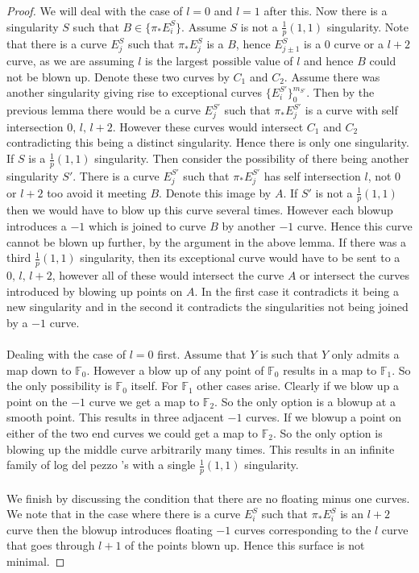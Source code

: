 \documentclass[11pt]{report}
\theoremstyle{definition}
\theoremstyle{definition}
\theoremstyle{definition}
\theoremstyle{definition}
\theoremstyle{definition}
\theoremstyle{definition}
\theoremstyle{definition}
\theoremstyle{definition}
\newcommand{\ldp}{log del pezzo }
\newcommand{\mb}[1]{\mathbb{#1}}
\begin{document}
\begin{proof}
We will deal with the case of $l = 0$ and $l = 1$ after this. Now there is a singularity $S$ such that $B \in \{ \pi_*E_i^S \}$. Assume $S$ is not a $\frac{1}{p}(1,1)$ singularity. Note that there is a curve $E_j^S$ such that $\pi_* E_j^S$ is a $B$, hence $E_{j\pm 1}^S$ is a $0$ curve or a $l+2$ curve, as we are assuming $l$ is the largest possible value of $l$ and hence $B$ could not be blown up. Denote these two curves by $C_1$ and $C_2$. Assume there was another singularity giving rise to exceptional curves $\{ E_i^{S'} \}_{0}^{m_{S'}} $. Then by the previous lemma there would be a curve $E_j^{S'}$ such that $\pi_* E_j^{S'}$ is a curve with self intersection $0, \,  l,\,  l+2$. However these curves would intersect $C_1$ and $C_2$ contradicting this being a distinct singularity. Hence there is only one singularity. If $S$ is a $\frac{1}{p}(1,1)$ singularity. Then consider the possibility of there being another singularity $S'$. There is a curve $E_j^{S'}$ such that $\pi_* E_j^{S'}$ has self intersection $l$, not $0$ or $l+2$ too avoid it meeting $B$. Denote this image by $A$. If $S'$ is not a $\frac{1}{p}(1,1)$ then we would have to blow up this curve several times. However each blowup introduces a $-1$ which is joined to curve $B$ by another $-1$ curve. Hence this curve cannot be blown up further, by the argument in the above lemma. If there was a third $\frac{1}{p}(1,1)$ singularity, then its exceptional curve would have to be sent to a $0, \, l, \, l+2$, however all of these would intersect the curve $A$ or intersect the curves introduced by blowing up points on $A$. In the first case it contradicts it being a new singularity and in the second it contradicts the singularities not being joined by a $-1$ curve.
\\
\\
Dealing with the case of $l = 0$ first. Assume that $Y$ is such that $Y$ only admits a map down to $\mb{F}_0$. However a blow up of any point of $\mb{F}_0$ results in a map to $\mb{F}_1$. So the only possibility is $\mb{F}_0$ itself. For $\mb{F}_1$ other cases arise. Clearly if we blow up a point on the $-1$ curve we get a map to $\mb{F}_2$. So the only option is a blowup at a smooth point. This results in three adjacent $-1$ curves. If we blowup a point on either of the two end curves we could get a map to $\mb{F}_2$. So the only option is blowing up the middle curve arbitrarily many times. This results in an infinite family of \ldp's with a single $\frac{1}{p}(1,1)$ singularity. 
\\
\\
We finish by discussing the condition that there are no floating minus one curves. We note that in the case where there is a curve $E_i^S$ such that $\pi_* E_i^S$ is an $l+2$ curve then the blowup introduces floating $-1$ curves corresponding to the $l$ curve that goes through $l+1$ of the points blown up. Hence this surface is not minimal.
\end{proof}
\end{document}
